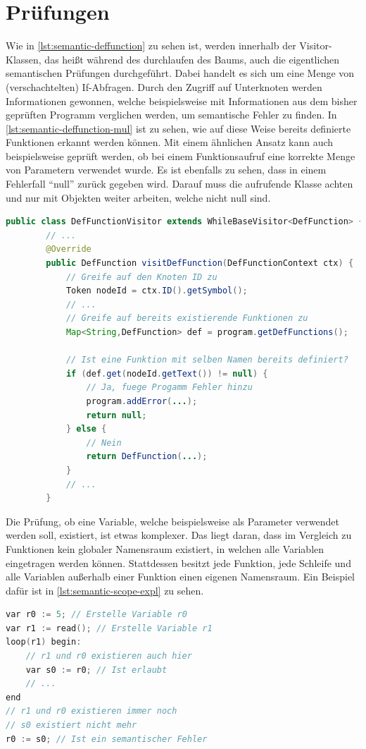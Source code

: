 \section{Prüfungen}
Wie in \cref{lst:semantic-deffunction} zu sehen ist, werden innerhalb der Visitor-Klassen, das heißt während des durchlaufen des Baums, auch die eigentlichen semantischen Prüfungen durchgeführt. Dabei handelt es sich um eine Menge von (verschachtelten) If-Abfragen. Durch den Zugriff auf Unterknoten werden Informationen gewonnen, welche beispielsweise mit Informationen aus dem bisher geprüften Programm verglichen werden, um semantische Fehler zu finden. In \cref{lst:semantic-deffunction-mul} ist zu sehen, wie auf diese Weise bereits definierte Funktionen erkannt werden können. Mit einem ähnlichen Ansatz kann auch beispielsweise geprüft werden, ob bei einem Funktionsaufruf eine korrekte Menge von Parametern verwendet wurde. Es ist ebenfalls zu sehen, dass in einem Fehlerfall \enquote{null} zurück gegeben wird. Darauf muss die aufrufende Klasse achten und nur mit Objekten weiter arbeiten, welche nicht null sind.

\begin{lstlisting}[language=java, caption=Erkenne bereits definierte Funktionen, label={lst:semantic-deffunction-mul}]
	public class DefFunctionVisitor extends WhileBaseVisitor<DefFunction> {
		// ...
		@Override
		public DefFunction visitDefFunction(DefFunctionContext ctx) {
			// Greife auf den Knoten ID zu
			Token nodeId = ctx.ID().getSymbol();
			// ...
			// Greife auf bereits existierende Funktionen zu
			Map<String,DefFunction> def = program.getDefFunctions();
			
			// Ist eine Funktion mit selben Namen bereits definiert?
			if (def.get(nodeId.getText()) != null) {
				// Ja, fuege Progamm Fehler hinzu
				program.addError(...);
				return null;
			} else {
				// Nein
				return DefFunction(...);
			}
			// ...
		}
\end{lstlisting}

Die Prüfung, ob eine Variable, welche beispielsweise als Parameter verwendet werden soll, existiert, ist etwas komplexer. Das liegt daran, dass im Vergleich zu Funktionen kein globaler Namensraum existiert, in welchen alle Variablen eingetragen werden können. Stattdessen besitzt jede Funktion, jede Schleife und alle Variablen außerhalb einer Funktion einen eigenen Namensraum. Ein Beispiel dafür ist in \cref{lst:semantic-scope-expl} zu sehen.

\begin{lstlisting}[language=c, caption=Scope Beispiel, label={lst:semantic-scope-expl}]
var r0 := 5; // Erstelle Variable r0
var r1 := read(); // Erstelle Variable r1
loop(r1) begin: 
	// r1 und r0 existieren auch hier
	var s0 := r0; // Ist erlaubt
	// ... 
end
// r1 und r0 existieren immer noch
// s0 existiert nicht mehr
r0 := s0; // Ist ein semantischer Fehler
\end{lstlisting}

